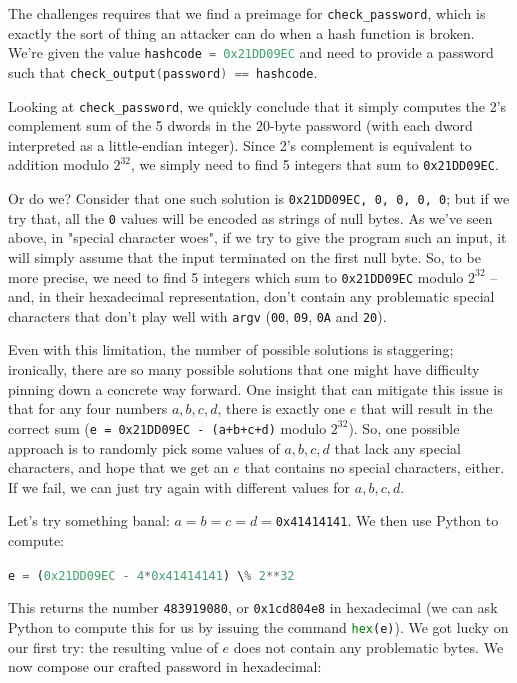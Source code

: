 \documentclass{article}
\newcommand{\xcode}[2]{\colorbox{ubuntuback}{\lstinline[language=#1]|#2|}}
\newcommand{\code}[1]{\colorbox{ubuntuback}{\texttt{#1}}}
\begin{document}
The challenges requires that we find a preimage for \code{check\_password}, which is exactly the sort of thing an attacker can do when a hash function is broken. We're given the value \xcode{C}{hashcode = 0x21DD09EC} and need to provide a password such that \xcode{C}{check_output(password) == hashcode}.

Looking at \code{check\_password}, we quickly conclude that it simply computes the 2's complement sum of the 5 dwords in the 20-byte password (with each dword interpreted as a little-endian integer). Since 2's complement is equivalent to addition modulo $2^{32}$, we simply need to find 5 integers that sum to \code{0x21DD09EC}. 

Or do we? Consider that one such solution is \code{0x21DD09EC, 0, 0, 0, 0}; but if we try that, all the \code{0} values will be encoded as strings of null bytes. As we've seen above, in "special character woes", if we try to give the program such an input, it will simply assume that the input terminated on the first null byte. So, to be more precise, we need to find 5 integers which sum to \code{0x21DD09EC} modulo $2^{32}$ -- and, in their hexadecimal representation, don't contain any problematic special characters that don't play well with \code{argv} (\code{00}, \code{09}, \code{0A} and \code{20}).

Even with this limitation, the number of possible solutions is staggering; ironically, there are so many possible solutions that one might have difficulty pinning down a concrete way forward. One insight that can mitigate this issue is that for any four numbers $a, b, c, d$, there is exactly one $e$ that will result in the correct sum (\code{e = 0x21DD09EC - (a+b+c+d)} modulo $2^{32}$). So, one possible approach is to randomly pick some values of $a, b, c, d$ that lack any special characters, and hope that we get an $e$ that contains no special characters, either. If we fail, we can just try again with different values for $a, b, c, d$.

Let's try something banal: $a = b = c = d =$\code{0x41414141}. We then use Python to compute:

\xcode{python}{e = (0x21DD09EC - 4*0x41414141) \% 2**32}

This returns the number \code{483919080}, or \code{0x1cd804e8} in hexadecimal (we can ask Python to compute this for us by issuing the command \xcode{python}{hex(e)}). We got lucky on our first try: the resulting value of $e$ does not contain any problematic bytes. We now compose our crafted password in hexadecimal: 
\end{document}
